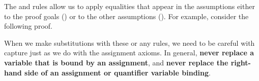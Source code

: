 \documentclass[11pt,twoside]{scrartcl}
\begin{document}
\vspace{1ex}
The  and  rules allow us to apply equalities that appear in the assumptions either to the proof goals () or to the other assumptions ().
For example, consider the following proof.
\begin{sequentdeduction}[array]
 {
}
\end{sequentdeduction}
When we make substitutions with these or any rules, we need to be careful with capture just as we do with the assignment axioms.
In general, \textbf{never replace a variable that is bound by an assignment}, and \textbf{never replace the right-hand side of an assignment or quantifier variable binding}.
\end{document}
